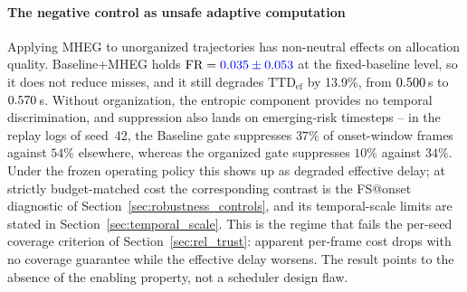 \documentclass[a4paper,fleqn]{cas-dc}
\newcommand{\MHEG}{\mbox{MHEG}\xspace}
\begin{document}
\begin{table}[!tbp]
\centering
\caption{Global factorial study results under continuous causal streaming
(mean $\pm$ inter-seed standard deviation{\color{\revcolor}; twelve seeds,
42--53}). {\color{\revcolor}Twelve-seed campaign executed with the same frozen
pipeline as the initial four-seed campaign; ms/f is measured wall-clock time
and is homogeneous within this campaign.}}
\label{tab:resultados_principais}
\scriptsize
\setlength{\tabcolsep}{3pt}
\renewcommand{\arraystretch}{1.22}
%
\end{table}
\paragraph{The negative control as unsafe adaptive computation}
Applying \MHEG to unorganized trajectories has non-neutral effects on allocation
quality. Baseline+MHEG holds $\text{FR} = {\color{blue}0.035 \pm 0.053}$
at the fixed-baseline level, so it does not reduce misses, and it still degrades
$\mathrm{TTD}_{\mathrm{ef}}$ by {\color{\revcolor}13.9\%, from $0.500$\,s to
$0.570$\,s}. {\color{\revcolor}Without organization, the entropic component provides no
temporal discrimination, and suppression also lands on emerging-risk
timesteps -- in the replay logs of seed~42, the
Baseline gate suppresses $37\%$ of onset-window frames against $54\%$
elsewhere, whereas the organized gate suppresses $10\%$ against $34\%$. Under
the frozen operating policy this shows up as degraded effective delay; at
strictly budget-matched cost the corresponding contrast is the FS@onset
diagnostic of Section~\ref{sec:robustness_controls}, and its temporal-scale
limits are stated in Section~\ref{sec:temporal_scale}.} This is the
regime that fails the per-seed coverage criterion of
Section~\ref{sec:rel_trust}: apparent per-frame cost drops with no coverage
guarantee while the effective delay worsens. The result points to the absence of the enabling
property, not a scheduler design flaw.
\end{document}
